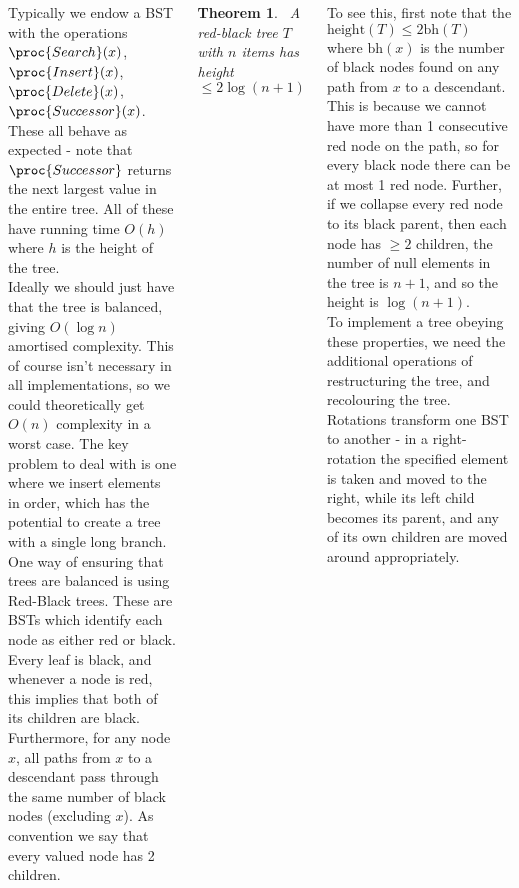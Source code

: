 \documentclass{tikzposter} %
\newtheorem{theorem}{Theorem}
\begin{document}
\begin{columns}
{{   Typically we endow a BST with the operations $\proc{Search}(x)$, $\proc{Insert}(x)$, $\proc{Delete}(x)$, $\proc{Successor}(x)$. These all behave as expected - note that $\proc{Successor}$ returns the next largest value in the entire tree. All of these have running time $O(h)$ where $h$ is the height of the tree. \\

   Ideally we should just have that the tree is balanced, giving $O(\log n)$ amortised complexity. This of course isn't necessary in all implementations, so we could theoretically get $O(n)$ complexity in a worst case. The key problem to deal with is one where we insert elements in order, which has the potential to create a tree with a single long branch. \\

   One way of ensuring that trees are balanced is using Red-Black trees. These are BSTs which identify each node as either red or black. Every leaf is black, and whenever a node is red, this implies that both of its children are black. Furthermore, for any node $x$, all paths from $x$ to a descendant pass through the same number of black nodes (excluding $x$). As convention we say that every valued node has 2 children. \\

   \begin{theorem}
   \ A red-black tree $T$ with $n$ items has height $\le 2 \log (n+1)$
   \end{theorem}
   \hphantom{}

   To see this, first note that the $\mathrm{height}(T) \le 2\mathrm{bh}(T)$ where $\mathrm{bh}(x)$ is the number of black nodes found on any path from $x$ to a descendant. This is because we cannot have more than 1 consecutive red node on the path, so for every black node there can be at most 1 red node. Further, if we collapse every red node to its black parent, then each node has $\ge 2$ children, the number of null elements in the tree is $n+1$, and so the height is $\log(n+1)$. \\

   To implement a tree obeying these properties, we need the additional operations of restructuring the tree, and recolouring the tree. Rotations transform one BST to another - in a right-rotation the specified element is taken and moved to the right, while its left child becomes its parent, and any of its own children are moved around appropriately. \\

}}
\end{columns}
\end{document}
